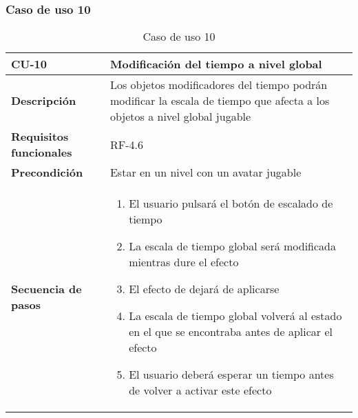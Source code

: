 \subsubsection{Caso de uso 10}
\begin{longtable}{l|l}
\caption{Caso de uso 10}\\
\begin{minipage}{0.25\columnwidth}
\textbf{CU-10} 
\end{minipage}
&
\begin{minipage}{0.65\columnwidth}
Modificación del tiempo a nivel global
\end{minipage}
\\ \hline

\begin{minipage}{0.25\columnwidth}
\textbf{Descripción} 
\end{minipage}
&
\begin{minipage}{0.65\columnwidth}
Los objetos modificadores del tiempo podrán modificar la escala de tiempo que afecta a los objetos a nivel global jugable
\end{minipage}
\\ \hline

\begin{minipage}{0.25\columnwidth}
\textbf{Requisitos funcionales} 
\end{minipage}
&
\begin{minipage}{0.65\columnwidth}
RF-4.6
\end{minipage}
\\ \hline

\begin{minipage}{0.25\columnwidth}
\textbf{Precondición} 
\end{minipage}
&
\begin{minipage}{0.65\columnwidth}
Estar en un nivel con un avatar jugable
\end{minipage}
\\ \hline

\begin{minipage}{0.25\columnwidth}
\textbf{Secuencia de pasos} 
\end{minipage}
&
\begin{minipage}{0.65\columnwidth}
\begin{enumerate}
\item
El usuario pulsará el botón de escalado de tiempo
\item
La escala de tiempo global será modificada mientras dure el efecto
\item
El efecto de dejará de aplicarse
\item
La escala de tiempo global volverá al estado en el que se encontraba antes de aplicar el efecto
\item
El usuario deberá esperar un tiempo antes de volver a activar este efecto
\end{enumerate}
\end{minipage}
\\ \hline


\end{longtable}
